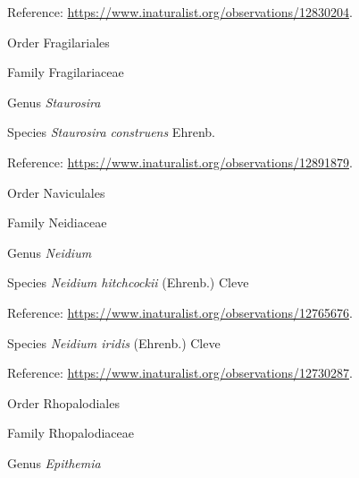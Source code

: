 \documentclass[9pt, article]{memoir}
\begin{document}
\begin{multicols}{2}
Reference: 
\url{https://www.inaturalist.org/observations/12830204}.

\vspace{6pt}\noindent\hspace{18pt}Order Fragilariales


\vspace{6pt}\noindent\hspace{24pt}Family Fragilariaceae


\vspace{6pt}\noindent\hspace{30pt}Genus \textit{Staurosira}


\vspace{6pt}\noindent\hspace{36pt}Species \textit{Staurosira construens} Ehrenb.


Reference: 
\url{https://www.inaturalist.org/observations/12891879}.

\vspace{6pt}\noindent\hspace{18pt}Order Naviculales


\vspace{6pt}\noindent\hspace{24pt}Family Neidiaceae


\vspace{6pt}\noindent\hspace{30pt}Genus \textit{Neidium}


\vspace{6pt}\noindent\hspace{36pt}Species \textit{Neidium hitchcockii} (Ehrenb.) Cleve


Reference: 
\url{https://www.inaturalist.org/observations/12765676}.

\vspace{6pt}\noindent\hspace{36pt}Species \textit{Neidium iridis} (Ehrenb.) Cleve


Reference: 
\url{https://www.inaturalist.org/observations/12730287}.

\vspace{6pt}\noindent\hspace{18pt}Order Rhopalodiales


\vspace{6pt}\noindent\hspace{24pt}Family Rhopalodiaceae


\vspace{6pt}\noindent\hspace{30pt}Genus \textit{Epithemia}



\end{multicols}
\end{document}

